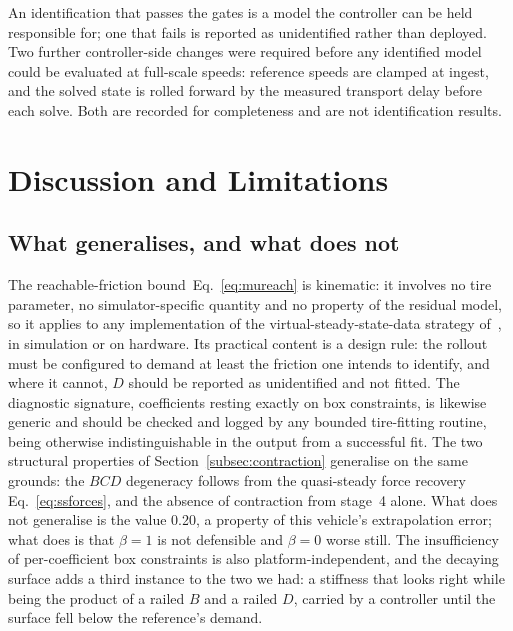 \documentclass[lineno,12pt]{sn-jnl}
\DeclareRobustCommand{\num}[1]{#1}
\theoremstyle{thmstyleone}%
\theoremstyle{thmstyletwo}%
\theoremstyle{thmstylethree}%
\begin{document}
An identification that passes the gates is a model the controller can be held
responsible for; one that fails is reported as unidentified rather than
deployed. Two further controller-side changes were required before any
identified model could be evaluated at full-scale speeds: reference speeds are
clamped at ingest, and the solved state is rolled forward by the measured
transport delay before each solve. Both are recorded for completeness and are
not identification results.

\section{Discussion and Limitations}
\label{sec:disc}

\subsection{What generalises, and what does not}

The reachable-friction bound~Eq.~\eqref{eq:mureach} is kinematic: it involves no
tire parameter, no simulator-specific quantity and no property of the residual
model, so it applies to any implementation of the virtual-steady-state-data
strategy of~\cite{ontrack2025}, in simulation or on hardware. Its practical
content is a design rule: the rollout must be configured to demand at least the
friction one intends to identify, and where it cannot, $D$ should be reported
as unidentified and not fitted. The diagnostic signature, coefficients
resting exactly on box constraints, is likewise generic and should be checked
and logged by any bounded tire-fitting routine, being otherwise
indistinguishable in the output from a successful fit. The two structural
properties of Section~\ref{subsec:contraction} generalise on the same grounds:
the $BCD$ degeneracy follows from the quasi-steady force recovery
Eq.~\eqref{eq:ssforces}, and the absence of contraction from stage~4 alone. What
does not generalise is the value \num{0.20}, a property of this vehicle's
extrapolation error; what does is that $\beta=1$ is not defensible and
$\beta=0$ worse still. The insufficiency of per-coefficient box constraints is
also platform-independent, and the decaying surface adds a third instance to
the two we had: a stiffness that looks right while being the product of a
railed $B$ and a railed $D$, carried by a controller until the surface fell
below the reference's demand.
\end{document}
